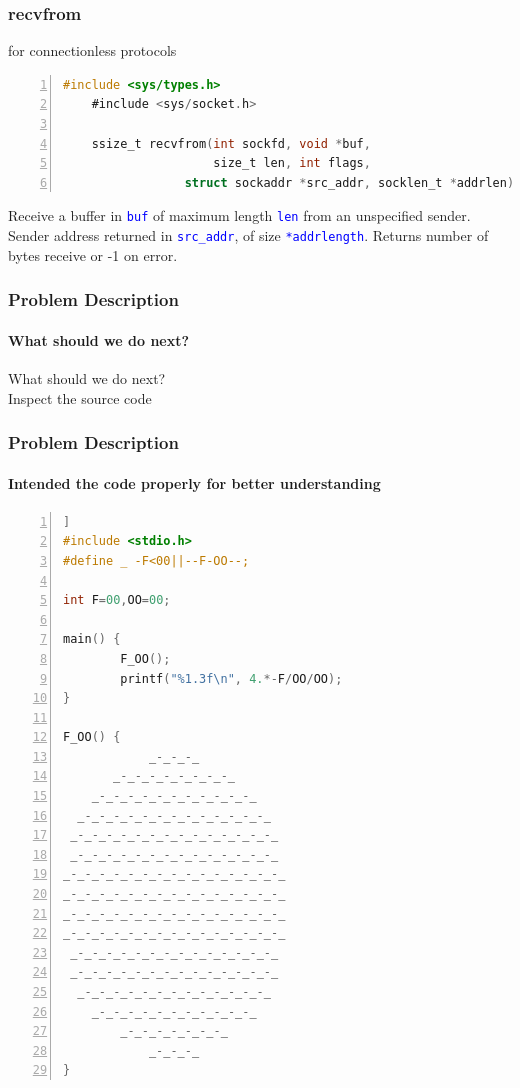\documentclass[12pt]{beamer}
\begin{document}
\begin{frame}[fragile]
	\frametitle{recvfrom}
	{\footnotesize for connectionless protocols}
	{\tiny
	\begin{lstlisting}[language=C, breaklines=true, commentstyle=\color{mygreen},frame=lrtb,  rulecolor=\color{black}, numbers=left,  numbersep=5pt, numberstyle=\tiny\color{mygray}]
	#include <sys/types.h>
	#include <sys/socket.h>
	
	ssize_t recvfrom(int sockfd, void *buf, 
	                 size_t len, int flags,
                 struct sockaddr *src_addr, socklen_t *addrlen);
	\end{lstlisting}}
	{\footnotesize
Receive a buffer in \texttt{\textcolor{blue}{buf}} of maximum length \texttt{\textcolor{blue}{len}} from an unspecified sender. \\Sender address returned in \texttt{\textcolor{blue}{src\_addr}}, of size \texttt{\textcolor{blue}{*addrlength}}. Returns number of bytes receive or -1 on error.
	}
\end{frame}	


\begin{frame}
	\frametitle{Problem Description}
	\framesubtitle{What should we do next?}
	\begin{center}
		\small {What should we do next?} \\
		\large Inspect the source code
	\end{center}
\end{frame}

\begin{frame}[fragile]
	\frametitle{Problem Description}
	\framesubtitle{Intended the code properly for better understanding}
	\begin{lstlisting}[language=C, breaklines=true, commentstyle=\color{mygreen}, rulecolor=\color{black}, numbers=left,  numbersep=2pt, numberstyle=\tiny\color{mygray}] ]
#include <stdio.h>
#define _ -F<00||--F-OO--;

int F=00,OO=00;

main() {
        F_OO();
        printf("%1.3f\n", 4.*-F/OO/OO);
}

F_OO() {
            _-_-_-_
       _-_-_-_-_-_-_-_-_
    _-_-_-_-_-_-_-_-_-_-_-_
  _-_-_-_-_-_-_-_-_-_-_-_-_-_
 _-_-_-_-_-_-_-_-_-_-_-_-_-_-_
 _-_-_-_-_-_-_-_-_-_-_-_-_-_-_
_-_-_-_-_-_-_-_-_-_-_-_-_-_-_-_
_-_-_-_-_-_-_-_-_-_-_-_-_-_-_-_
_-_-_-_-_-_-_-_-_-_-_-_-_-_-_-_
_-_-_-_-_-_-_-_-_-_-_-_-_-_-_-_
 _-_-_-_-_-_-_-_-_-_-_-_-_-_-_
 _-_-_-_-_-_-_-_-_-_-_-_-_-_-_
  _-_-_-_-_-_-_-_-_-_-_-_-_-_
    _-_-_-_-_-_-_-_-_-_-_-_
        _-_-_-_-_-_-_-_
            _-_-_-_
}
	\end{lstlisting}

\end{frame}
\end{document}
